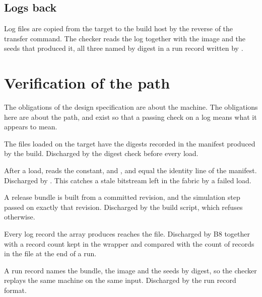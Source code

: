 \subsection{Logs back}
Log files are copied from the target to the build host by the reverse of the
transfer command. The checker reads the log together with the image and the
seeds that produced it, all three named by digest in a run record written by
.

\section{Verification of the path}\label{sec:verify}

The obligations of the design specification are about the machine. The
obligations here are about the path, and exist so that a passing check on a
log means what it appears to mean.

\begin{obligation}[Integrity]\label{ob:integrity}
The files loaded on the target have the digests recorded in the manifest
produced by the build. Discharged by the digest check before every load.
\end{obligation}

\begin{obligation}[Identity]\label{ob:identity}
After a load,  reads the constant, and ,
 and  equal the identity line of the manifest.
Discharged by . This catches a stale bitstream left in the
fabric by a failed load.
\end{obligation}

\begin{obligation}[Provenance]\label{ob:prov}
A release bundle is built from a committed revision, and the simulation step
passed on exactly that revision. Discharged by the build script, which
refuses otherwise.
\end{obligation}

\begin{obligation}\label{ob:complete}
Every log record the array produces reaches the file. Discharged by B8
together with a record count kept in the wrapper and compared with the count
of records in the file at the end of a run.
\end{obligation}

\begin{obligation}\label{ob:repro}
A run record names the bundle, the image and the seeds by digest, so the
checker replays the same machine on the same input. Discharged by the run
record format.
\end{obligation}

